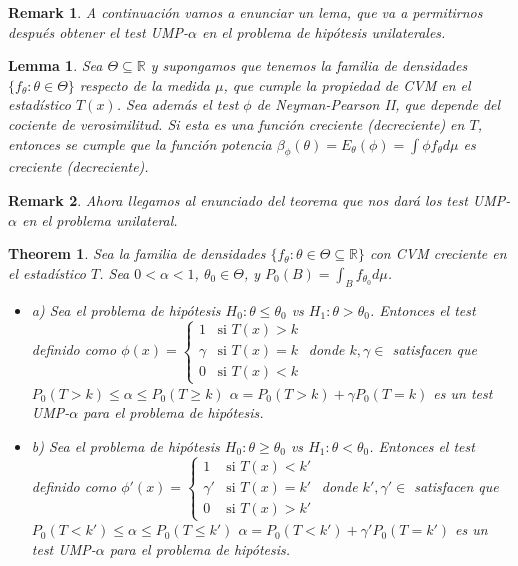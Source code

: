 \documentclass{article}
\theoremstyle{remarkstyle}
\newtheorem*{remark}{Remark}
\theoremstyle{examplestyle}
\theoremstyle{definitionstyle}
\theoremstyle{lemmastyle}
\newtheorem*{lemma}{Lemma}
\theoremstyle{theoremstyle}
\newtheorem*{theorem}{Theorem}
\begin{document}
\begin{remark}
A continuación vamos a enunciar un lema, que va a permitirnos después obtener el test UMP-$\alpha$ en el problema de hipótesis unilaterales.
\end{remark}

\begin{lemma}
Sea $\Theta \subseteq \mathbb{R}$ y supongamos que tenemos la familia de densidades $\{f_\theta : \theta \in \Theta\}$ respecto de la medida $\mu$, que cumple la propiedad de CVM en el estadístico $T(x)$. Sea además el test $\phi$ de Neyman-Pearson II, que depende del cociente de verosimilitud. Si esta es una función creciente (decreciente) en $T$, entonces se cumple que la función potencia
$\beta_\phi(\theta) = E_\theta(\phi) = \int \phi f_\theta d\mu$
es creciente (decreciente).
\end{lemma}

\begin{remark}
Ahora llegamos al enunciado del teorema que nos dará los test UMP-$\alpha$ en el problema unilateral.
\end{remark}

\begin{theorem}
Sea la familia de densidades $\{f_\theta : \theta \in \Theta \subseteq \mathbb{R}\}$ con CVM creciente en el estadístico $T$. Sea $0 < \alpha < 1$, $\theta_0 \in \Theta$, y $P_0(B) = \int_B f_{\theta_0} d\mu$.
\begin{itemize}
    \item a) Sea el problema de hipótesis
    $H_0: \theta \le \theta_0$ vs $H_1: \theta > \theta_0$.
    Entonces el test definido como
    $\phi(x) = \begin{cases} 1 & \text{si } T(x) > k \\ \gamma & \text{si } T(x) = k \\ 0 & \text{si } T(x) < k \end{cases}$
    donde $k, \gamma \in$ satisfacen que
    $P_0(T>k) \le \alpha \le P_0(T \ge k)$
    $\alpha = P_0(T>k) + \gamma P_0(T=k)$
    es un test UMP-$\alpha$ para el problema de hipótesis.
    \item b) Sea el problema de hipótesis
    $H_0: \theta \ge \theta_0$ vs $H_1: \theta < \theta_0$.
    Entonces el test definido como
    $\phi'(x) = \begin{cases} 1 & \text{si } T(x) < k' \\ \gamma' & \text{si } T(x) = k' \\ 0 & \text{si } T(x) > k' \end{cases}$
    donde $k', \gamma' \in$ satisfacen que
    $P_0(T < k') \le \alpha \le P_0(T \le k')$
    $\alpha = P_0(T < k') + \gamma' P_0(T=k')$
    es un test UMP-$\alpha$ para el problema de hipótesis.
\end{itemize}
\end{theorem}
\end{document}
